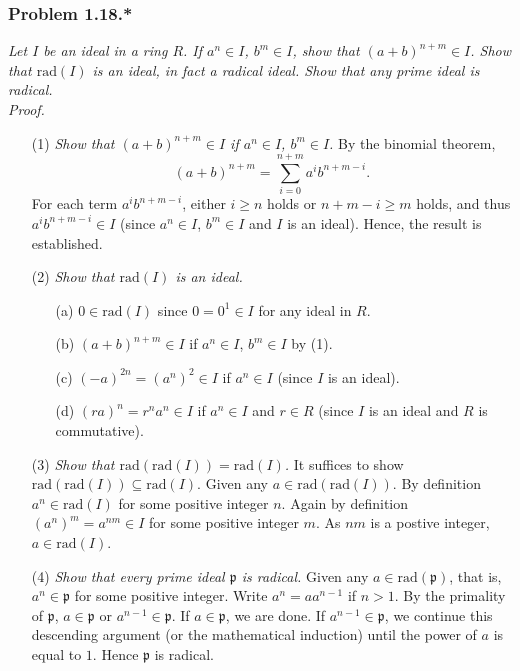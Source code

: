 \documentclass{article}
\begin{document}



\subsubsection*{Problem 1.18.*}
\emph{Let $I$ be an ideal in a ring $R$.
If $a^n \in I$, $b^m \in I$, show that $(a+b)^{n+m} \in I$.
Show that $\mathrm{rad}(I)$ is an ideal, in fact a radical ideal.
Show that any prime ideal is radical.} \\

\emph{Proof.}
\begin{enumerate}
\item[(1)]
  \emph{Show that $(a+b)^{n+m} \in I$ if $a^n \in I$, $b^m \in I$.}
  By the binomial theorem,
  \[
    (a+b)^{n+m}=\sum_{i=0}^{n+m} a^i b^{n+m-i}.
  \]
  For each term $a^i b^{n+m-i}$, either $i \geq n$ holds or $n+m-i \geq m$ holds,
  and thus $a^i b^{n+m-i} \in I$ (since $a^n \in I$, $b^m \in I$ and $I$ is an ideal).
  Hence, the result is established.

\item[(2)]
  \emph{Show that $\mathrm{rad}(I)$ is an ideal.}
  \begin{enumerate}
  \item[(a)]
    $0 \in \mathrm{rad}(I)$ since $0 = 0^{1} \in I$ for any ideal in $R$.

  \item[(b)]
    $(a+b)^{n+m} \in I$ if $a^n \in I$, $b^m \in I$ by (1).

  \item[(c)]
    $(-a)^{2n} = (a^n)^2 \in I$ if $a^n \in I$ (since $I$ is an ideal).

  \item[(d)]
    $(ra)^n = r^n a^n \in I$ if $a^n \in I$ and $r \in R$ (since $I$ is an ideal and $R$ is commutative).
  \end{enumerate}

\item[(3)]
  \emph{Show that $\mathrm{rad}(\mathrm{rad}(I)) = \mathrm{rad}(I)$.}
  It suffices to show $\mathrm{rad}(\mathrm{rad}(I)) \subseteq \mathrm{rad}(I)$.
  Given any $a \in \mathrm{rad}(\mathrm{rad}(I))$.
  By definition $a^n \in \mathrm{rad}(I)$ for some positive integer $n$.
  Again by definition $(a^n)^m = a^{nm} \in I$ for some positive integer $m$.
  As $nm$ is a postive integer, $a \in \mathrm{rad}(I)$.

\item[(4)]
  \emph{Show that every prime ideal $\mathfrak{p}$ is radical.}
  Given any $a \in \mathrm{rad}(\mathfrak{p})$, that is,
  $a^n \in \mathfrak{p}$ for some positive integer.
  Write $a^n = a a^{n-1}$ if $n > 1$.
  By the primality of $\mathfrak{p}$, $a \in \mathfrak{p}$ or $a^{n-1} \in \mathfrak{p}$.
  If $a \in \mathfrak{p}$, we are done.
  If $a^{n-1} \in \mathfrak{p}$,
  we continue this descending argument (or the mathematical induction)
  until the power of $a$ is equal to $1$.
  Hence $\mathfrak{p}$ is radical.
\end{enumerate}
\end{document}
